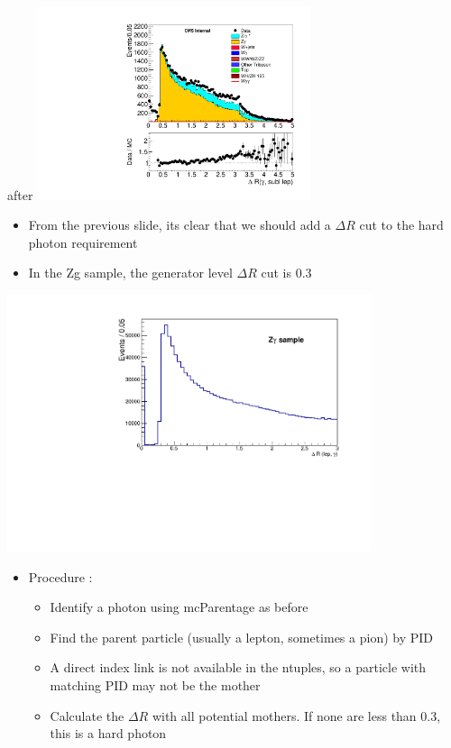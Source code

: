 \documentclass{beamer}
\begin{document}
{        after
        \includegraphics[width=0.6\textwidth]{Plots/m_leplep_mumuph_phsubllepDR_oldOlap.pdf}

    \ec

}

 {

    \bc
        \begin{itemize}
            \item From the previous slide, its clear that we should add a $\Delta R$ cut to the hard photon requirement
            \item In the Zg sample, the generator level $\Delta R$ cut is 0.3
        \end{itemize}
     
        
        \includegraphics[width=0.8\textwidth]{Plots/LepPhotDRTruthZg.pdf}

    \ec

    \begin{itemize}
        \item Procedure :
        \begin{itemize} 
            \item Identify a photon using mcParentage as before
            \item Find the parent particle (usually a lepton, sometimes a pion) by PID
            \item A direct index link is not available in the ntuples, so a particle with matching PID may not be the mother
            \item Calculate the $\Delta R$ with all potential mothers.  If none are less than 0.3, this is a hard photon
        \end{itemize}
    \end{itemize}

}
\end{document}
